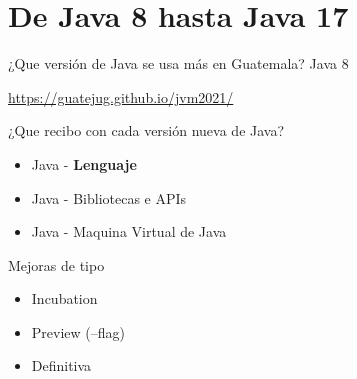 \documentclass[aspectratio=169]{beamer}
\begin{document}
{
    \section{De Java 8 hasta Java 17}
}

\begin{frame}[fragile]{¿Que versión de Java se usa más en Guatemala?}
\LARGE Java 8

\url{https://guatejug.github.io/jvm2021/}
\end{frame}





\begin{frame}[fragile]{¿Que recibo con cada versión nueva de Java?}
	\begin{itemize}
		\item Java - \textbf{Lenguaje}
		\item Java - Bibliotecas e APIs
		\item Java - Maquina Virtual de Java
	\end{itemize}	
    Mejoras de tipo
    \begin{itemize}
   		\item Incubation
   		\item Preview (--flag)
   		\item Definitiva
   	\end{itemize}	
\end{frame}
\end{document}
